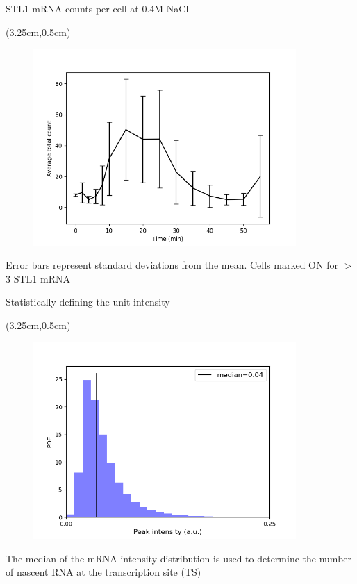 \documentclass[aspectratio=1610]{beamer}					%
\begin{document}
\begin{frame}{STL1 mRNA counts per cell at 0.4M NaCl}

\begin{textblock*}{5cm}(3.25cm,0.5cm)
\begin{figure}
\includegraphics[width=10cm]{avg-count.png}
\end{figure}
\end{textblock*}

\vspace{7.25cm}
Error bars represent standard deviations from the mean. Cells marked ON for $>$ 3 STL1 mRNA

\end{frame}

\begin{frame}{Statistically defining the unit intensity}

\begin{textblock*}{5cm}(3.25cm,0.5cm)
\begin{figure}
\includegraphics[width=10cm]{int-hist.png}
\end{figure}
\end{textblock*}

\vspace{7.25cm}
The median of the mRNA intensity distribution is used to determine the number of nascent RNA at the transcription site (TS)

\end{frame}
\end{document}
